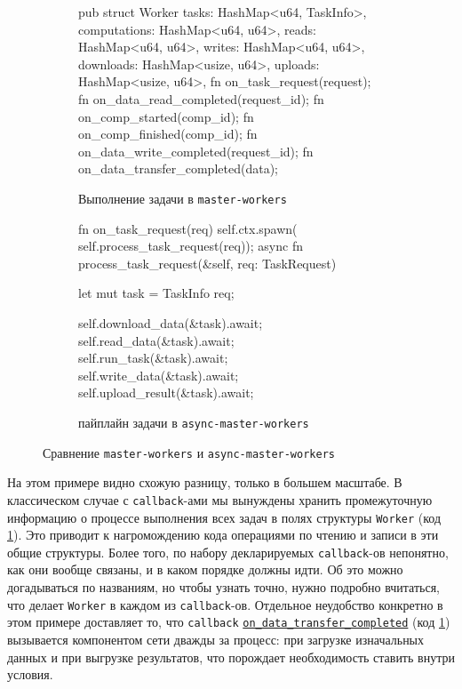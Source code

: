 \begin{figure}[H]
    \hspace{-0.55cm}
    \centering
    \begin{subfigure}[b]{0.537\linewidth}
        \footnotesize
        \centering
        \begin{rustcode}
pub struct Worker {
  tasks: HashMap<u64, TaskInfo>,
  computations: HashMap<u64, u64>,
  reads: HashMap<u64, u64>,
  writes: HashMap<u64, u64>,
  downloads: HashMap<usize, u64>,
  uploads: HashMap<usize, u64>,
}
fn on_task_request(request);
fn on_data_read_completed(request_id);
fn on_comp_started(comp_id);
fn on_comp_finished(comp_id);
fn on_data_write_completed(request_id);
fn on_data_transfer_completed(data);
    \end{rustcode}
        \caption{Выполнение задачи в \texttt{master-workers}}
        \label{master-workers}
    \end{subfigure}
    \hfill
    \begin{subfigure}[b]{0.48\linewidth}
        \footnotesize
        \centering
        \begin{rustcode}
fn on_task_request(req) {
  self.ctx.spawn(
    self.process_task_request(req));
}
async fn process_task_request(&self, req: TaskRequest) {
  let mut task = TaskInfo {req};

  self.download_data(&task).await;
  self.read_data(&task).await;
  self.run_task(&task).await;
  self.write_data(&task).await;
  self.upload_result(&task).await;
}
    \end{rustcode}
    \caption{пайплайн задачи в \texttt{async-master-workers}}
    \label{async-master-workers}
\end{subfigure}
\caption{Сравнение \texttt{master-workers} и \texttt{async-master-workers}}
\label{master-workers-comparison}
\end{figure}

На этом примере видно схожую разницу, только в большем масштабе. В классическом случае с \texttt{callback}-ами мы вынуждены хранить промежуточную информацию о процессе выполнения всех задач в полях структуры \texttt{Worker} (код \ref{master-workers}). Это приводит к нагромождению кода операциями по чтению и записи в эти общие структуры. Более того, по набору декларируемых \texttt{callback}-ов непонятно, как они вообще связаны, и в каком порядке должны идти. Об это можно догадываться по названиям, но чтобы узнать точно, нужно подробно вчитаться, что делает \texttt{Worker} в каждом из \texttt{callback}-ов. Отдельное неудобство конкретно в этом примере доставляет то, что \texttt{callback} \texttt{\underline{on\_data\_transfer\_completed}} (код \ref{master-workers}) вызывается компонентом сети дважды за процесс: при загрузке изначальных данных и при выгрузке результатов, что порождает необходимость ставить внутри условия.  

